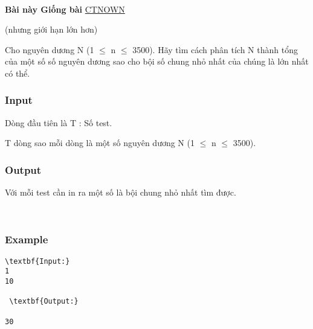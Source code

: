 

 

\textbf{Bài này Giống bài }\href{http://vnoi.info/problems/show/CTNOWN/}{CTNOWN}

(nhưng giới hạn lớn hơn)

Cho nguyên dương N (1 $\le$ n $\le$ 3500). Hãy tìm cách phân tích N thành tổng của một số số nguyên dương sao cho bội số chung nhỏ nhất của chúng là lớn nhất có thể.

\subsubsection{Input}

Dòng đầu tiên là T : Số test.

T dòng sao mỗi dòng là một số nguyên dương N (1 $\le$ n  $\le$ 3500).

\subsubsection{Output}

Với mỗi test cần in ra một số là bội chung nhỏ nhất tìm được.

 

\subsubsection{Example}
\begin{verbatim}
\textbf{Input:}
1
10

 \textbf{Output:}

30
\end{verbatim}
